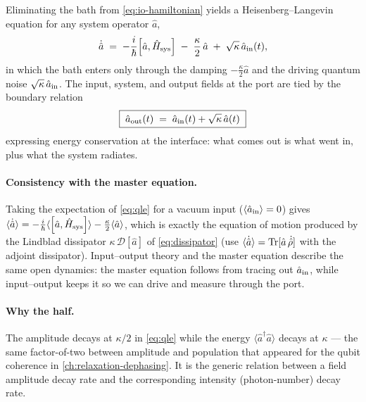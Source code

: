 \begin{statement}
\label{stmt:input-output}
Eliminating the bath from \cref{eq:io-hamiltonian} yields a
Heisenberg--Langevin equation for any system operator $\hat a$,
\begin{equation}
\label{eq:qle}
\dot{\hat a} \;=\; -\frac{i}{\hbar}\comm{\hat a}{\op H_{\rm sys}}
\;-\; \frac{\kappa}{2}\,\hat a \;+\; \sqrt{\kappa}\,\hat a_{\rm in}(t),
\end{equation}
in which the bath enters only through the damping $-\tfrac{\kappa}{2}\hat a$
and the driving quantum noise $\sqrt{\kappa}\,\hat a_{\rm in}$. The
input, system, and output fields at the port are tied by the
boundary relation
\begin{equation}
\label{eq:input-output-relation}
\boxed{\;\hat a_{\rm out}(t) \;=\; \hat a_{\rm in}(t) + \sqrt{\kappa}\,\hat a(t)\;}
\end{equation}
expressing energy conservation at the interface: what comes out is
what went in, plus what the system radiates.
\end{statement}

\paragraph{Consistency with the master equation.}
Taking the expectation of \cref{eq:qle} for a vacuum input
($\langle\hat a_{\rm in}\rangle=0$) gives
$\langle\dot{\hat a}\rangle=-\tfrac{i}{\hbar}\langle\comm{\hat a}{\op H_{\rm sys}}\rangle-\tfrac{\kappa}{2}\langle\hat a\rangle$,
which is exactly the equation of motion produced by the Lindblad
dissipator $\kappa\,\mathcal D[\hat a]$ of \cref{eq:dissipator}
(use $\langle\dot{\hat a}\rangle=\operatorname{Tr}[\hat a\,\dot{\hat{\rho}}]$ with
the adjoint dissipator). Input--output theory and the master
equation describe the same open dynamics: the master equation
follows from tracing out $\hat a_{\rm in}$, while input--output
keeps it so we can drive and measure through the port.

\paragraph{Why the half.}
The amplitude decays at $\kappa/2$ in \cref{eq:qle} while the energy
$\langle\hat a^\dagger\hat a\rangle$ decays at $\kappa$ --- the same
factor-of-two between amplitude and population that appeared for the
qubit coherence in \cref{ch:relaxation-dephasing}. It is the generic
relation between a field amplitude decay rate and the corresponding
intensity (photon-number) decay rate.

